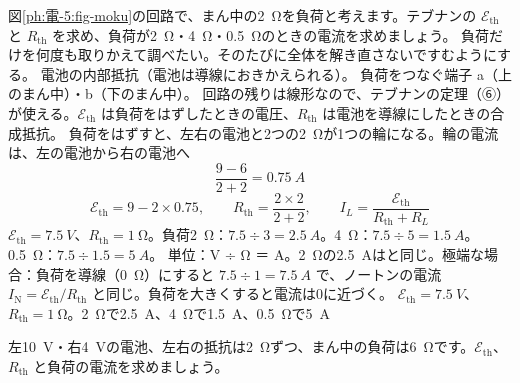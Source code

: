\begin{phreidai}
\label{ph:電-5:ex8}図\ref{ph:電-5:fig-moku}の回路で、まん中の\qty{2}{\ohm}を負荷と考えます。テブナンの $\mathcal E_{\mathrm{th}}$ と $R_{\mathrm{th}}$ を求め、負荷が\qty{2}{\ohm}・\qty{4}{\ohm}・\qty{0.5}{\ohm}のときの電流を求めましょう。
\phbamen
負荷だけを何度も取りかえて調べたい。そのたびに全体を解き直さないですむようにする。
\phmushi
電池の内部抵抗（電池は導線におきかえられる）。
\phzu
負荷をつなぐ端子 a（上のまん中）・b（下のまん中）。
\phriyu
回路の残りは線形なので、テブナンの定理（⑥）が使える。$\mathcal E_{\mathrm{th}}$ は負荷をはずしたときの電圧、$R_{\mathrm{th}}$ は電池を導線にしたときの合成抵抗。
\phtateru
負荷をはずすと、左右の電池と2つの\qty{2}{\ohm}が1つの輪になる。輪の電流は、左の電池から右の電池へ
\[ \frac{9-6}{2+2}=\qty{0.75}{A} \]
\[ \mathcal E_{\mathrm{th}}=9-2\times0.75,\qquad R_{\mathrm{th}}=\frac{2\times2}{2+2},\qquad I_L=\frac{\mathcal E_{\mathrm{th}}}{R_{\mathrm{th}}+R_L} \]
\phtoku
$\mathcal E_{\mathrm{th}}=\qty{7.5}{V}$、$R_{\mathrm{th}}=\qty{1}{\ohm}$。負荷\qty{2}{\ohm}：$7.5\div3=\qty{2.5}{A}$。\qty{4}{\ohm}：$7.5\div5=\qty{1.5}{A}$。\qty{0.5}{\ohm}：$7.5\div1.5=\qty{5}{A}$。
\phtashikame
単位：V ÷ Ω ＝ A。\qty{2}{\ohm}の\qty{2.5}{A}はと同じ。極端な場合：負荷を導線（\qty{0}{\ohm}）にすると $7.5\div1=\qty{7.5}{A}$ で、ノートンの電流 $I_{\mathrm N}=\mathcal E_{\mathrm{th}}/R_{\mathrm{th}}$ と同じ。負荷を大きくすると電流は0に近づく。
\kotae $\mathcal E_{\mathrm{th}}=\qty{7.5}{V}$、$R_{\mathrm{th}}=\qty{1}{\ohm}$。\qty{2}{\ohm}で\qty{2.5}{A}、\qty{4}{\ohm}で\qty{1.5}{A}、\qty{0.5}{\ohm}で\qty{5}{A}
\end{phreidai}
\begin{jibun}
左\qty{10}{V}・右\qty{4}{V}の電池、左右の抵抗は\qty{2}{\ohm}ずつ、まん中の負荷は\qty{6}{\ohm}です。$\mathcal E_{\mathrm{th}}$、$R_{\mathrm{th}}$ と負荷の電流を求めましょう。
\end{jibun}

